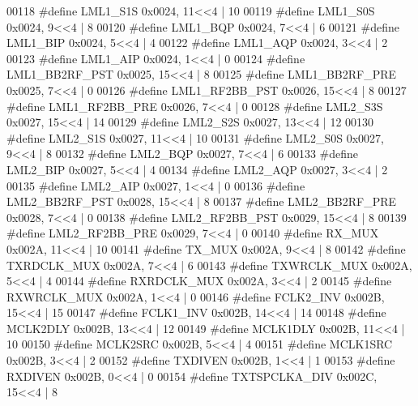 \begin{DoxyCode}
00118 \textcolor{preprocessor}{#define LML1\_S1S 0x0024, 11<<4 |  10}
00119 \textcolor{preprocessor}{#define LML1\_S0S 0x0024, 9<<4 |  8}
00120 \textcolor{preprocessor}{#define LML1\_BQP 0x0024, 7<<4 |  6}
00121 \textcolor{preprocessor}{#define LML1\_BIP 0x0024, 5<<4 |  4}
00122 \textcolor{preprocessor}{#define LML1\_AQP 0x0024, 3<<4 |  2}
00123 \textcolor{preprocessor}{#define LML1\_AIP 0x0024, 1<<4 |  0}
00124 \textcolor{preprocessor}{#define LML1\_BB2RF\_PST 0x0025, 15<<4 |  8}
00125 \textcolor{preprocessor}{#define LML1\_BB2RF\_PRE 0x0025, 7<<4 |  0}
00126 \textcolor{preprocessor}{#define LML1\_RF2BB\_PST 0x0026, 15<<4 |  8}
00127 \textcolor{preprocessor}{#define LML1\_RF2BB\_PRE 0x0026, 7<<4 |  0}
00128 \textcolor{preprocessor}{#define LML2\_S3S 0x0027, 15<<4 |  14}
00129 \textcolor{preprocessor}{#define LML2\_S2S 0x0027, 13<<4 |  12}
00130 \textcolor{preprocessor}{#define LML2\_S1S 0x0027, 11<<4 |  10}
00131 \textcolor{preprocessor}{#define LML2\_S0S 0x0027, 9<<4 |  8}
00132 \textcolor{preprocessor}{#define LML2\_BQP 0x0027, 7<<4 |  6}
00133 \textcolor{preprocessor}{#define LML2\_BIP 0x0027, 5<<4 |  4}
00134 \textcolor{preprocessor}{#define LML2\_AQP 0x0027, 3<<4 |  2}
00135 \textcolor{preprocessor}{#define LML2\_AIP 0x0027, 1<<4 |  0}
00136 \textcolor{preprocessor}{#define LML2\_BB2RF\_PST 0x0028, 15<<4 |  8}
00137 \textcolor{preprocessor}{#define LML2\_BB2RF\_PRE 0x0028, 7<<4 |  0}
00138 \textcolor{preprocessor}{#define LML2\_RF2BB\_PST 0x0029, 15<<4 |  8}
00139 \textcolor{preprocessor}{#define LML2\_RF2BB\_PRE 0x0029, 7<<4 |  0}
00140 \textcolor{preprocessor}{#define RX\_MUX 0x002A, 11<<4 |  10}
00141 \textcolor{preprocessor}{#define TX\_MUX 0x002A, 9<<4 |  8}
00142 \textcolor{preprocessor}{#define TXRDCLK\_MUX 0x002A, 7<<4 |  6}
00143 \textcolor{preprocessor}{#define TXWRCLK\_MUX 0x002A, 5<<4 |  4}
00144 \textcolor{preprocessor}{#define RXRDCLK\_MUX 0x002A, 3<<4 |  2}
00145 \textcolor{preprocessor}{#define RXWRCLK\_MUX 0x002A, 1<<4 |  0}
00146 \textcolor{preprocessor}{#define FCLK2\_INV 0x002B, 15<<4 |  15}
00147 \textcolor{preprocessor}{#define FCLK1\_INV 0x002B, 14<<4 |  14}
00148 \textcolor{preprocessor}{#define MCLK2DLY 0x002B, 13<<4 |  12}
00149 \textcolor{preprocessor}{#define MCLK1DLY 0x002B, 11<<4 |  10}
00150 \textcolor{preprocessor}{#define MCLK2SRC 0x002B, 5<<4 |  4}
00151 \textcolor{preprocessor}{#define MCLK1SRC 0x002B, 3<<4 |  2}
00152 \textcolor{preprocessor}{#define TXDIVEN 0x002B, 1<<4 |  1}
00153 \textcolor{preprocessor}{#define RXDIVEN 0x002B, 0<<4 |  0}
00154 \textcolor{preprocessor}{#define TXTSPCLKA\_DIV 0x002C, 15<<4 |  8}

\end{DoxyCode}
